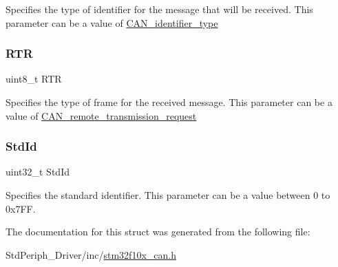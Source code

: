 Specifies the type of identifier for the message that will be received. This parameter can be a value of \mbox{\hyperlink{group___c_a_n__identifier__type}{C\+A\+N\+\_\+identifier\+\_\+type}} \mbox{\label{struct_can_rx_msg_a131e825d532b66f27dbb74aa80864d37}} 
\subsubsection{\texorpdfstring{RTR}{RTR}}
{\footnotesize\ttfamily uint8\+\_\+t R\+TR}

Specifies the type of frame for the received message. This parameter can be a value of \mbox{\hyperlink{group___c_a_n__remote__transmission__request}{C\+A\+N\+\_\+remote\+\_\+transmission\+\_\+request}} \mbox{\label{struct_can_rx_msg_a511131786af8d1534273e48ea2052245}} 
\subsubsection{\texorpdfstring{StdId}{StdId}}
{\footnotesize\ttfamily uint32\+\_\+t Std\+Id}

Specifies the standard identifier. This parameter can be a value between 0 to 0x7\+FF. 

The documentation for this struct was generated from the following file\+:\begin{DoxyCompactItemize}
\item 
Std\+Periph\+\_\+\+Driver/inc/\mbox{\hyperlink{stm32f10x__can_8h}{stm32f10x\+\_\+can.\+h}}\end{DoxyCompactItemize}
